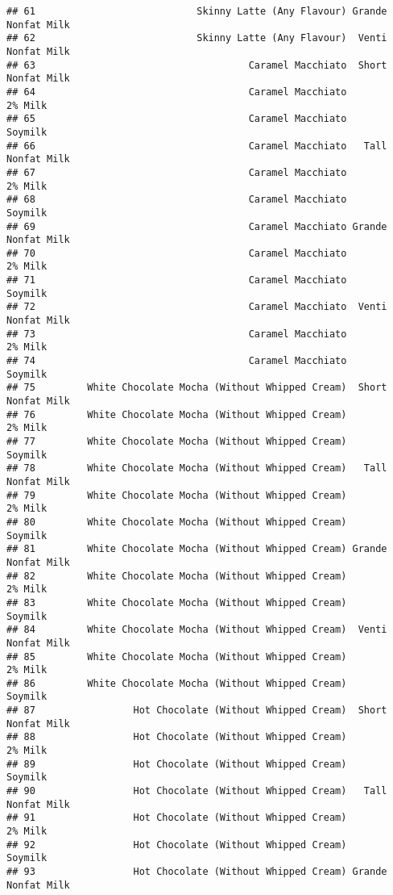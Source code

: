 \documentclass[
]{article}
\begin{document}
\begin{verbatim}
## 61                            Skinny Latte (Any Flavour) Grande Nonfat Milk
## 62                            Skinny Latte (Any Flavour)  Venti Nonfat Milk
## 63                                     Caramel Macchiato  Short Nonfat Milk
## 64                                     Caramel Macchiato            2% Milk
## 65                                     Caramel Macchiato            Soymilk
## 66                                     Caramel Macchiato   Tall Nonfat Milk
## 67                                     Caramel Macchiato            2% Milk
## 68                                     Caramel Macchiato            Soymilk
## 69                                     Caramel Macchiato Grande Nonfat Milk
## 70                                     Caramel Macchiato            2% Milk
## 71                                     Caramel Macchiato            Soymilk
## 72                                     Caramel Macchiato  Venti Nonfat Milk
## 73                                     Caramel Macchiato            2% Milk
## 74                                     Caramel Macchiato            Soymilk
## 75         White Chocolate Mocha (Without Whipped Cream)  Short Nonfat Milk
## 76         White Chocolate Mocha (Without Whipped Cream)            2% Milk
## 77         White Chocolate Mocha (Without Whipped Cream)            Soymilk
## 78         White Chocolate Mocha (Without Whipped Cream)   Tall Nonfat Milk
## 79         White Chocolate Mocha (Without Whipped Cream)            2% Milk
## 80         White Chocolate Mocha (Without Whipped Cream)            Soymilk
## 81         White Chocolate Mocha (Without Whipped Cream) Grande Nonfat Milk
## 82         White Chocolate Mocha (Without Whipped Cream)            2% Milk
## 83         White Chocolate Mocha (Without Whipped Cream)            Soymilk
## 84         White Chocolate Mocha (Without Whipped Cream)  Venti Nonfat Milk
## 85         White Chocolate Mocha (Without Whipped Cream)            2% Milk
## 86         White Chocolate Mocha (Without Whipped Cream)            Soymilk
## 87                 Hot Chocolate (Without Whipped Cream)  Short Nonfat Milk
## 88                 Hot Chocolate (Without Whipped Cream)            2% Milk
## 89                 Hot Chocolate (Without Whipped Cream)            Soymilk
## 90                 Hot Chocolate (Without Whipped Cream)   Tall Nonfat Milk
## 91                 Hot Chocolate (Without Whipped Cream)            2% Milk
## 92                 Hot Chocolate (Without Whipped Cream)            Soymilk
## 93                 Hot Chocolate (Without Whipped Cream) Grande Nonfat Milk

\end{verbatim}
\end{document}
